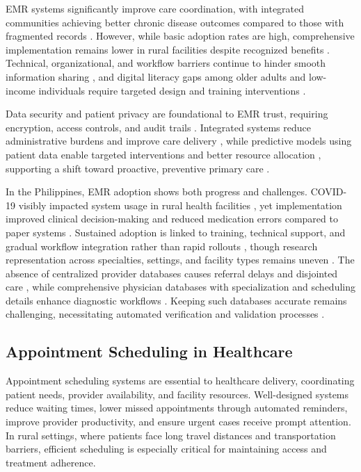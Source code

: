 \documentclass{research}
\begin{document}
EMR systems significantly improve care coordination, with integrated communities achieving better
chronic disease outcomes compared to those with fragmented records \cite{Mendoza2023,Gill2020}.
However, while basic adoption rates are high, comprehensive implementation remains lower in rural
facilities despite recognized benefits \cite{DAmore2021,Anzalone2025}. Technical, organizational,
and workflow barriers continue to hinder smooth information sharing \cite{Ngugi2021,AdlerMilstein2023,Rhoades2025},
and digital literacy gaps among older adults and low-income individuals require targeted design and
training interventions \cite{Abdul2024}.

Data security and patient privacy are foundational to EMR trust, requiring encryption, access
controls, and audit trails \cite{Smith2021}. Integrated systems reduce administrative burdens and
improve care delivery \cite{Betancor2024,Kucuk2024,Mazaheri2024}, while predictive models using
patient data enable targeted interventions and better resource allocation \cite{Ferro2020,Dantas2018},
supporting a shift toward proactive, preventive primary care \cite{Cusack2020}.

In the Philippines, EMR adoption shows both progress and challenges. COVID-19 visibly impacted
system usage in rural health facilities \cite{Acacio2024}, yet implementation improved clinical
decision-making and reduced medication errors compared to paper systems \cite{Santos2021}.
Sustained adoption is linked to training, technical support, and gradual workflow integration
rather than rapid rollouts \cite{Mendoza2023}, though research representation across specialties,
settings, and facility types remains uneven \cite{Derecho2024}. The absence of centralized
provider databases causes referral delays and disjointed care \cite{Reyes2023}, while comprehensive
physician databases with specialization and scheduling details enhance diagnostic workflows
\cite{Hernandez2022}. Keeping such databases accurate remains challenging, necessitating automated
verification and validation processes \cite{Patel2023}.

\subsection*{Appointment Scheduling in Healthcare}

Appointment scheduling systems are essential to healthcare delivery, coordinating patient needs,
provider availability, and facility resources. Well-designed systems reduce waiting times, lower
missed appointments through automated reminders, improve provider productivity, and ensure urgent
cases receive prompt attention. In rural settings, where patients face long travel distances and
transportation barriers, efficient scheduling is especially critical for maintaining access and
treatment adherence.
\end{document}
